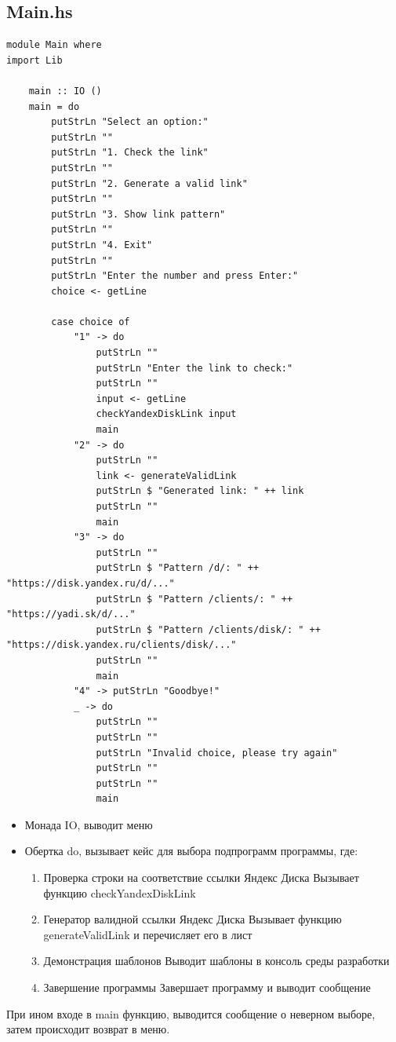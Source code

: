\documentclass[areasetadvanced]{scrartcl}
\begin{document}
\subsection{Main.hs}
\begin{lstlisting}[caption={Main.hs}, label={lst:example}]
module Main where
import Lib
	
	main :: IO ()
	main = do
		putStrLn "Select an option:"
		putStrLn ""
		putStrLn "1. Check the link"
		putStrLn ""
		putStrLn "2. Generate a valid link"
		putStrLn ""
		putStrLn "3. Show link pattern"
		putStrLn ""
		putStrLn "4. Exit"
		putStrLn ""
		putStrLn "Enter the number and press Enter:"
		choice <- getLine
	
		case choice of
			"1" -> do
				putStrLn ""
				putStrLn "Enter the link to check:"
				putStrLn ""
				input <- getLine
				checkYandexDiskLink input
				main
			"2" -> do
				putStrLn ""
				link <- generateValidLink
				putStrLn $ "Generated link: " ++ link
				putStrLn ""
				main
			"3" -> do
				putStrLn ""
				putStrLn $ "Pattern /d/: " ++ "https://disk.yandex.ru/d/..."
				putStrLn $ "Pattern /clients/: " ++ "https://yadi.sk/d/..."
				putStrLn $ "Pattern /clients/disk/: " ++ "https://disk.yandex.ru/clients/disk/..."
				putStrLn ""
				main
			"4" -> putStrLn "Goodbye!"
			_ -> do
				putStrLn ""
				putStrLn ""
				putStrLn "Invalid choice, please try again"
				putStrLn ""
				putStrLn ""
				main
\end{lstlisting}
\begin{itemize}
	\item Монада IO, выводит меню
	\item Обертка do, вызывает кейс для выбора подпрограмм программы, где:
	\begin {enumerate}
	\item Проверка строки на соответствие ссылки Яндекс Диска
	\subitem Вызывает функцию checkYandexDiskLink
	\item Генератор валидной ссылки Яндекс Диска
	\subitem Вызывает функцию generateValidLink и перечисляет его в лист
	\item Демонстрация шаблонов
	\subitem Выводит шаблоны в консоль среды разработки
	\item Завершение программы
	\subitem Завершает программу и выводит сообщение
	\end{enumerate}
\end{itemize}
При ином входе в main функцию, выводится сообщение о неверном выборе, затем происходит возврат в меню.

\newpage
\end{document}
